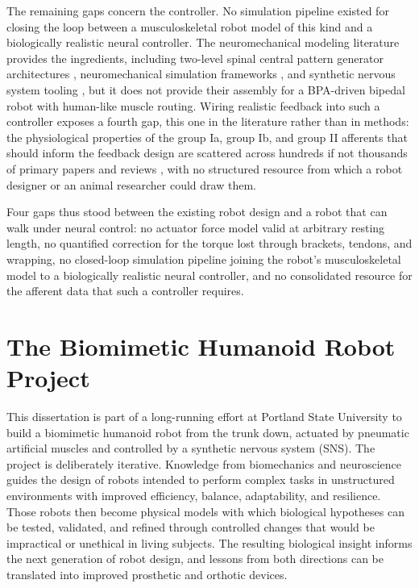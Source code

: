 The remaining gaps concern the controller. No simulation pipeline existed for closing the loop between a musculoskeletal robot model of this kind and a biologically realistic neural controller. The neuromechanical modeling literature provides the ingredients, including two-level spinal central pattern generator architectures \citep{rybak_modelling_2006, mccrea_organization_2008}, neuromechanical simulation frameworks \citep{markin_afferent_2010}, and synthetic nervous system tooling \citep{nourse_sns_2023}, but it does not provide their assembly for a BPA-driven bipedal robot with human-like muscle routing. Wiring realistic feedback into such a controller exposes a fourth gap, this one in the literature rather than in methods: the physiological properties of the group Ia, group Ib, and group II afferents that should inform the feedback design are scattered across hundreds if not thousands of primary papers and reviews \citep{van_de_crommert_review_1998, windhorst_muscle_2007, windhorst_spinal_2022}, with no structured resource from which a robot designer or an animal researcher could draw them.

Four gaps thus stood between the existing robot design and a robot that can walk under neural control: no actuator force model valid at arbitrary resting length, no quantified correction for the torque lost through brackets, tendons, and wrapping, no closed-loop simulation pipeline joining the robot's musculoskeletal model to a biologically realistic neural controller, and no consolidated resource for the afferent data that such a controller requires.

\section{The Biomimetic Humanoid Robot Project}\label{sec:project}

This dissertation is part of a long-running effort at Portland State University to build a biomimetic humanoid robot from the trunk down, actuated by pneumatic artificial muscles and controlled by a synthetic nervous system (SNS). The project is deliberately iterative. Knowledge from biomechanics and neuroscience guides the design of robots intended to perform complex tasks in unstructured environments with improved efficiency, balance, adaptability, and resilience. Those robots then become physical models with which biological hypotheses can be tested, validated, and refined through controlled changes that would be impractical or unethical in living subjects. The resulting biological insight informs the next generation of robot design, and lessons from both directions can be translated into improved prosthetic and orthotic devices.

